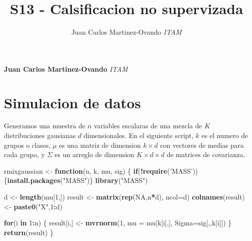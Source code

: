 \documentclass[11pt,]{article}
\title{S13 - Calsificacion no supervizada  }
\author{\Large Juan Carlos Martinez-Ovando\vspace{0.05in} \newline\normalsize\emph{ITAM}  }
\date{}
\newcommand*{\authorfont}{\fontfamily{phv}\selectfont}
\newenvironment{Shaded}{\begin{snugshade}}{\end{snugshade}}
\newcommand{\KeywordTok}[1]{\textcolor[rgb]{0.13,0.29,0.53}{\textbf{#1}}}
\newcommand{\DataTypeTok}[1]{\textcolor[rgb]{0.13,0.29,0.53}{#1}}
\newcommand{\DecValTok}[1]{\textcolor[rgb]{0.00,0.00,0.81}{#1}}
\newcommand{\StringTok}[1]{\textcolor[rgb]{0.31,0.60,0.02}{#1}}
\newcommand{\OtherTok}[1]{\textcolor[rgb]{0.56,0.35,0.01}{#1}}
\newcommand{\ControlFlowTok}[1]{\textcolor[rgb]{0.13,0.29,0.53}{\textbf{#1}}}
\newcommand{\OperatorTok}[1]{\textcolor[rgb]{0.81,0.36,0.00}{\textbf{#1}}}
\newcommand{\NormalTok}[1]{#1}
\begin{document}
	
%

{%
\setlength{\parindent}{0pt}
\thispagestyle{plain}
{\fontsize{18}{20}\selectfont\raggedright 
\maketitle  %

}

{
   \vskip 13.5pt\relax \normalsize\fontsize{11}{12} 
\textbf{\authorfont Juan Carlos Martinez-Ovando} \hskip 15pt \emph{\small ITAM}   

}

}






\vskip 6.5pt


\noindent  \section{Simulacion de datos}\label{simulacion-de-datos}

Generamos una muestra de \(n\) variables escalaras de una mezcla de
\(K\) distribuciones gausianas \(d\) dimensionales. En el siguiente
script, \(k\) es el numero de grupos o clases, \(\mu\) es una matriz de
dimension \(k \times d\) con vectores de medias para cada grupo, y
\(\Sigma\) es un arreglo de dimension \(K \times d \times d\) de
matrices de covarianza.

\begin{Shaded}
\begin{Highlighting}[]
\NormalTok{rmixgaussian <-}\StringTok{ }\ControlFlowTok{function}\NormalTok{(n, k, mu, sig) \{}
  \ControlFlowTok{if}\NormalTok{(}\OperatorTok{!}\KeywordTok{require}\NormalTok{(}\StringTok{'MASS'}\NormalTok{))\{}\KeywordTok{install.packages}\NormalTok{(}\StringTok{"MASS"}\NormalTok{)\} }
  \KeywordTok{library}\NormalTok{(}\StringTok{"MASS"}\NormalTok{)}

\NormalTok{  d <-}\StringTok{ }\KeywordTok{length}\NormalTok{(mu[}\DecValTok{1}\NormalTok{,])}
\NormalTok{  result <-}\StringTok{ }\KeywordTok{matrix}\NormalTok{(}\KeywordTok{rep}\NormalTok{(}\OtherTok{NA}\NormalTok{,n}\OperatorTok{*}\NormalTok{d), }\DataTypeTok{ncol=}\NormalTok{d)}
  \KeywordTok{colnames}\NormalTok{(result) <-}\StringTok{ }\KeywordTok{paste0}\NormalTok{(}\StringTok{"X"}\NormalTok{,}\DecValTok{1}\OperatorTok{:}\NormalTok{d)}
  
  \ControlFlowTok{for}\NormalTok{(i }\ControlFlowTok{in} \DecValTok{1}\OperatorTok{:}\NormalTok{n) \{}
\NormalTok{    result[i,] <-}\StringTok{ }\KeywordTok{mvrnorm}\NormalTok{(}\DecValTok{1}\NormalTok{, }\DataTypeTok{mu =}\NormalTok{ mu[k[i],], }\DataTypeTok{Sigma=}\NormalTok{sig[,,k[i]])}
\NormalTok{  \}}
  \KeywordTok{return}\NormalTok{(result)}
\NormalTok{\}}
\end{Highlighting}
\end{Shaded}
\end{document}
